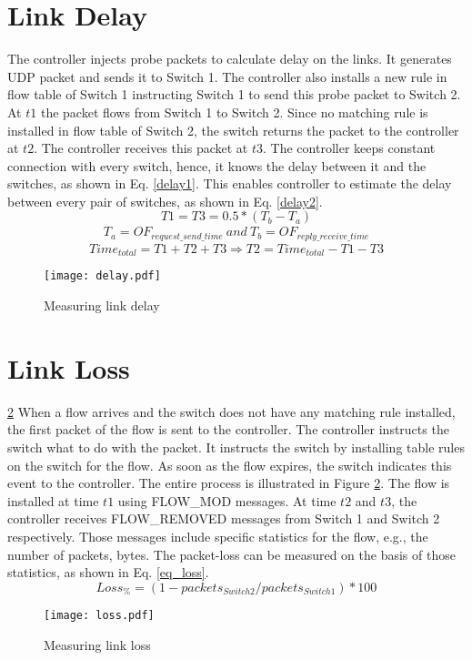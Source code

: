 \documentclass[11pt,a4paper]{report}
\begin{document}
		\section{Link Delay}
		The controller injects probe packets to calculate delay on the links. It generates UDP packet and sends it to Switch 1. The controller also installs a new rule in flow table of Switch 1 instructing Switch 1 to send this probe packet to Switch 2. At $t1$ the packet flows from Switch 1 to Switch 2. Since no matching rule is installed in flow table of Switch 2, the switch returns the packet to the controller at $t2$. The controller receives this packet at $t3$. The controller keeps constant connection with every switch, hence, it knows the delay between it and the switches, as shown in Eq. \ref{delay1}. This enables controller to estimate the delay	between every pair of switches, as shown in Eq. \ref{delay2}.
		\begin{equation}
		\label{delay1}
		T1 = T3 = 0.5 * (T_b - T_a)
		\end{equation}
		\vspace{-10mm}
		\begin{align}
		T_a = OF_{request\_send\_time} ~and~ T_b = OF_{reply\_receive\_time} \nonumber
		\end{align}
		\begin{equation}
		\label{delay2}
		Time_{total} = T1 + T2 + T3 \Rightarrow T2 = Time_{total} - T1 - T3
		\end{equation}

		\begin{figure}[!htbp]
			\label{delay}
			\centering
			\texttt{[image: delay.pdf]}
			\caption[]{Measuring link delay}
		\end{figure}		
	
	\section{Link Loss}\ref{loss}
	When a flow arrives and the switch does not have any matching rule installed, the first packet of the flow is sent to the controller. The controller instructs the switch what to do with	the packet. It instructs the switch by installing table rules on the switch for the flow. As soon as the flow expires, the switch indicates this event to the controller. The entire process is illustrated in Figure \ref{loss}. The flow is installed at time $t1$ using FLOW\_MOD messages. At time $t2$ and $t3$, the controller receives FLOW\_REMOVED messages from Switch 1 and Switch 2 respectively. Those messages include specific statistics for the flow, e.g., the number of packets, bytes. The packet-loss can be measured on the basis of those statistics, as shown in Eq. \ref{eq_loss}.
	\begin{equation}
	\label{eq_loss}
	Loss_\% = (1-packets_{Switch2}/packets_{Switch1})*100
	\end{equation}
	\begin{figure}[!htbp]
		\centering
		\texttt{[image: loss.pdf]}
		\caption[]{Measuring link loss}
		\label{loss}
	\end{figure}
	
\end{document}
